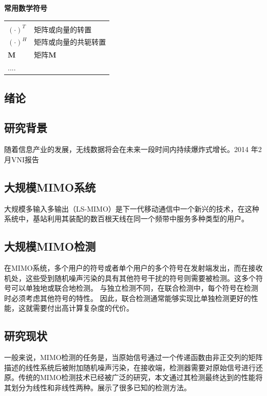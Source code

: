\documentclass[bachelor,oneside]{seuthesis} %
\begin{document}
\begin{spacing}{1.5}
\begin{terminology}
 \begin{table}[!hbp]\centering%
  \centerline{\bf {\Large 常用数学符号}}
 \begin{tabular}{ll}
  &\\
  $(\cdot)^T$&矩阵或向量的转置\\
  $(\cdot)^H$&矩阵或向量的共轭转置\\
  $\mathbf{M}$&矩阵$\mathbf{M}$\\
  ....









 \end{tabular}
 \end{table}
\end{terminology}

\begin{Main} %
\pagestyle{seustyle}
\chapter{绪论} \label{chapter:1}
\section{研究背景}
随着信息产业的发展，无线数据将会在未来一段时间内持续爆炸式增长。2014 年2月VNI报告
\section{大规模MIMO系统}
大规模多输入多输出（LS-MIMO）是下一代移动通信中一个新兴的技术\cite{marzetta2010noncooperative}，在这种系统中，基站利用其装配的数百根天线在同一个频带中服务多种类型的用户\cite{ngo2013energy,huh2012achieving,rusek2013scaling}。






\section{大规模MIMO检测}
在MIMO系统，多个用户的符号或者单个用户的多个符号在发射端发出，而在接收机处，这些受到随机噪声污染的具有其他符号干扰的符号则需要被检测。这多个符号可以单独地或联合地检测。 与独立检测不同，在联合检测中，每个符号在检测时必须考虑其他符号的特性。 因此，联合检测通常能够实现比单独检测更好的性能，这就需要付出高计算复杂度的代价。


\section{研究现状}
一般来说，MIMO检测的任务是，当原始信号通过一个传递函数由非正交列的矩阵描述的线性系统后被附加随机噪声污染，在接收端，检测器需要对原始信号进行还原\cite{yang2015fifty}。传统的MIMO检测技术已经被广泛的研究，本文通过其检测最终达到的性能将其划分为线性和非线性两种。展示了很多已知的检测方法。


\end{Main}
\end{spacing}
\end{document}
